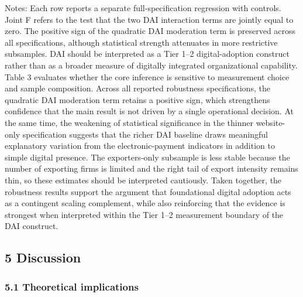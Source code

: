 \documentclass[
  12pt,a4paper]{article}
\begin{document}
Notes: Each row reports a separate full-specification regression with
controls. Joint F refers to the test that the two DAI interaction terms
are jointly equal to zero. The positive sign of the quadratic DAI
moderation term is preserved across all specifications, although
statistical strength attenuates in more restrictive subsamples. DAI
should be interpreted as a Tier 1--2 digital-adoption construct rather
than as a broader measure of digitally integrated organizational
capability. Table 3 evaluates whether the core inference is sensitive to
measurement choice and sample composition. Across all reported
robustness specifications, the quadratic DAI moderation term retains a
positive sign, which strengthens confidence that the main result is not
driven by a single operational decision. At the same time, the weakening
of statistical significance in the thinner website-only specification
suggests that the richer DAI baseline draws meaningful explanatory
variation from the electronic-payment indicators in addition to simple
digital presence. The exporters-only subsample is less stable because
the number of exporting firms is limited and the right tail of export
intensity remains thin, so these estimates should be interpreted
cautiously. Taken together, the robustness results support the argument
that foundational digital adoption acts as a contingent scaling
complement, while also reinforcing that the evidence is strongest when
interpreted within the Tier 1--2 measurement boundary of the DAI
construct.

\hypertarget{discussion}{%
\subsection{5 Discussion}\label{discussion}}

\hypertarget{theoretical-implications}{%
\subsubsection{5.1 Theoretical
implications}\label{theoretical-implications}}
\end{document}
